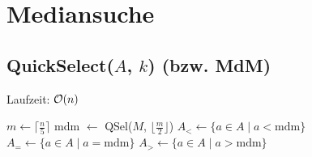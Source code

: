 \section*{Mediansuche}

\subsection*{QuickSelect($A$, $k$) (bzw. MdM)}
Laufzeit: $\mathcal{O}(n)$

\begin{algorithm}[H]
	$m \gets \lceil\frac{n}{5}\rceil$\;
	mdm $\gets$ QSel($M$, $\lfloor\frac{m}{2}\rfloor$)\;
	$A_{<} \gets \{a\in A \mid a < \text{mdm}\}$\;
	$A_{=} \gets \{a\in A \mid a = \text{mdm}\}$\;
	$A_{>} \gets \{a\in A \mid a > \text{mdm}\}$\;
\end{algorithm}
